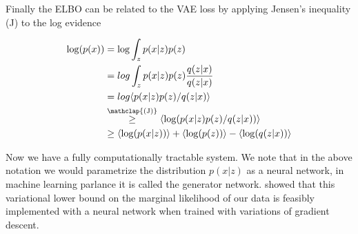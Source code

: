 \noindent Finally the ELBO can be related to the VAE loss by applying Jensen's inequality (J) to the log evidence 

\begin{align}
\log (p(x)) &= \log \int_z p(x|z) p(z) \\
&= log \int _z p(x|z) p(z) \frac{q(z|x)}{q(z|x)} \\
& = log \langle p(x|z) p(z)/ q(z|x) \rangle \\
&  \stackrel{\mathclap{\text{(J)}}}{\geq} \langle \log (p(x|z) p(z)/ q(z|x))\rangle \\
& \geq \langle \log(p(x|z))\rangle + \langle \log(p(z))\rangle  - \langle \log(q(z|x))\rangle 
\end{align}

\noindent Now we have a fully computationally tractable system. We note that in the above notation we would parametrize the distribution $p(x|z)$ as a neural network, in machine learning parlance it is called the generator network. \citet{Kingma2013} showed that this variational lower bound on the marginal likelihood of our data is feasibly implemented with a neural network when trained with variations of gradient descent. 
